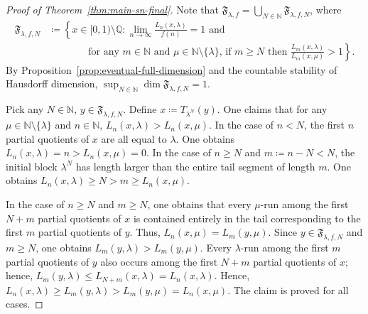 \documentclass[12pt,reqno]{amsart}
\theoremstyle{definition}
\theoremstyle{plain}
\begin{document}
\begin{proof}[Proof of Theorem~\ref{thm:main-sn-final}]
Note that $\mathfrak{F}_{\lambda,f}=\bigcup_{N\in\mathbb{N}}\mathfrak{F}_{\lambda,f,N}$, where
\begin{align*}
    \mathfrak{F}_{\lambda,f,N}
    &\coloneqq
    \left\{x\in[0,1)\setminus\mathbb{Q}:
    \lim_{n\to\infty}\frac{L_n(x,\lambda)}{f(n)}=1
    \text{ and }\right.\\
    &\qquad\qquad\left.\text{for any $m\in\mathbb{N}$ and $\mu\in\mathbb{N}\setminus\{\lambda\}$, if $m\geq N$ then }\frac{L_m(x,\lambda)}{L_m(x,\mu)}>1\right\}.
\end{align*}
By Proposition~\ref{prop:eventual-full-dimension} and the countable stability of Hausdorff dimension, $\sup_{N\in\mathbb{N}}{\dim{\mathfrak{F}_{\lambda,f,N}}}=1$.

Pick any $N\in\mathbb{N}$, $y\in\mathfrak{F}_{\lambda,f,N}$. Define $x\coloneqq T_{\lambda^N}(y)$. One claims that for any $\mu\in\mathbb{N}\setminus\{\lambda\}$ and $n\in\mathbb{N}$, $L_n(x,\lambda)>L_n(x,\mu)$. In the case of $n<N$, the first $n$ partial quotients of $x$ are all equal to $\lambda$. One obtains $L_n(x,\lambda)=n>L_n(x,\mu)=0$. In the case of $n\geq N$ and $m\coloneqq n-N<N$, the initial block $\lambda^N$ has length larger than the entire tail segment of length $m$. One obtains $L_n(x,\lambda)\geq N>m\geq L_n(x,\mu)$.

In the case of $n\geq N$ and $m\geq N$, one obtains that every $\mu$-run among the first $N+m$ partial quotients of $x$ is contained entirely in the tail corresponding to the first $m$ partial quotients of $y$. Thus, $L_n(x,\mu)=L_m(y,\mu)$. Since $y\in\mathfrak{F}_{\lambda,f,N}$ and $m\geq N$, one obtains $L_m(y,\lambda)>L_m(y,\mu)$. Every $\lambda$-run among the first $m$ partial quotients of $y$ also occurs among the first $N+m$ partial quotients of $x$; hence, $L_m(y,\lambda)\leq L_{N+m}(x,\lambda)=L_n(x,\lambda)$. Hence, $L_n(x,\lambda)\geq L_m(y,\lambda)>L_m(y,\mu)=L_n(x,\mu)$. The claim is proved for all cases.


\end{proof}
\end{document}
